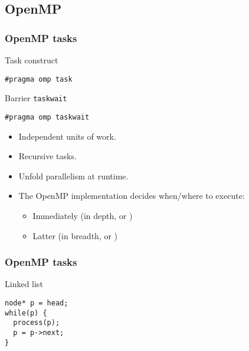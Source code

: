 \subsection{OpenMP}
\begin{frame}[fragile]
  \frametitle{OpenMP tasks}
\begin{block}{Task construct}
\begin{lstlisting}
#pragma omp task
\end{lstlisting}
\end{block}
%
\pause
%
\begin{block}{Barrier \texttt{taskwait}}
\begin{lstlisting}
#pragma omp taskwait
\end{lstlisting}
\end{block}
%
\pause
%
\begin{itemize}
\item Independent units of work.
\item Recursive tasks.
\item Unfold parallelism at runtime.
\item The OpenMP implementation decides when/where to execute: 
  \begin{itemize}
  \item Immediately (in depth,  or )
  \item Latter (in breadth,  or )
  \end{itemize}
\end{itemize}
%
\end{frame}
\begin{frame}[fragile]
  \frametitle{OpenMP tasks}
\begin{block}{Linked list}
\begin{lstlisting}
node* p = head;
while(p) {
  process(p);
  p = p->next;
}
\end{lstlisting}
\end{block}
%
\end{frame}
